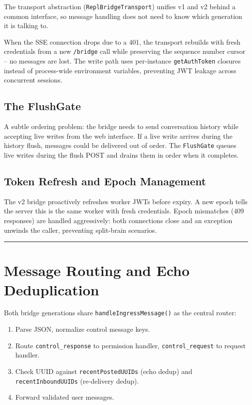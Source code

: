 \documentclass[
  english,
  11pt,
  letterpaper,
]{book}
\providecommand{\tightlist}{%
  \setlength{\itemsep}{0pt}\setlength{\parskip}{0pt}}
\begin{document}
The transport abstraction (\texttt{ReplBridgeTransport}) unifies v1 and
v2 behind a common interface, so message handling does not need to know
which generation it is talking to.

When the SSE connection drops due to a 401, the transport rebuilds with
fresh credentials from a new \texttt{/bridge} call while preserving the
sequence number cursor -- no messages are lost. The write path uses
per-instance \texttt{getAuthToken} closures instead of process-wide
environment variables, preventing JWT leakage across concurrent
sessions.

\subsection{The FlushGate}\label{the-flushgate}

A subtle ordering problem: the bridge needs to send conversation history
while accepting live writes from the web interface. If a live write
arrives during the history flush, messages could be delivered out of
order. The \texttt{FlushGate} queues live writes during the flush POST
and drains them in order when it completes.

\subsection{Token Refresh and Epoch
Management}\label{token-refresh-and-epoch-management}

The v2 bridge proactively refreshes worker JWTs before expiry. A new
epoch tells the server this is the same worker with fresh credentials.
Epoch mismatches (409 responses) are handled aggressively: both
connections close and an exception unwinds the caller, preventing
split-brain scenarios.

\begin{center}\rule{0.5\linewidth}{0.5pt}\end{center}

\section{Message Routing and Echo
Deduplication}\label{message-routing-and-echo-deduplication}

Both bridge generations share \texttt{handleIngressMessage()} as the
central router:

\begin{enumerate}
\def\labelenumi{\arabic{enumi}.}
\tightlist
\item
  Parse JSON, normalize control message keys.
\item
  Route \texttt{control\_response} to permission handler,
  \texttt{control\_request} to request handler.
\item
  Check UUID against \texttt{recentPostedUUIDs} (echo dedup) and
  \texttt{recentInboundUUIDs} (re-delivery dedup).
\item
  Forward validated user messages.
\end{enumerate}
\end{document}
